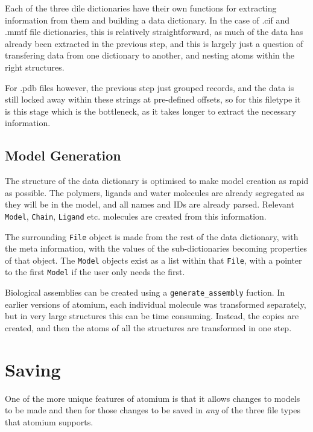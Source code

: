 Each of the three dile dictionaries have their own functions for extracting information from them and building a data dictionary. In the case of .cif and .mmtf file dictionaries, this is relatively straightforward, as much of the data has already been extracted in the previous step, and this is largely just a question of transfering data from one dictionary to another, and nesting atoms within the right structures. 

For .pdb files however, the previous step just grouped records, and the data is still locked away within these strings at pre-defined offsets, so for this filetype it is this stage which is the bottleneck, as it takes longer to extract the necessary information.

\subsection{Model Generation}

The structure of the data dictionary is optimised to make model creation as rapid as possible. The polymers, ligands and water molecules are already segregated as they will be in the model, and all names and IDs are already parsed. Relevant \texttt{Model}, \texttt{Chain}, \texttt{Ligand} etc. molecules are created from this information.

The surrounding \texttt{File} object is made from the rest of the data dictionary, with the meta information, with the values of the sub-dictionaries becoming properties of that object. The \texttt{Model} objects exist as a list within that \texttt{File}, with a pointer to the first \texttt{Model} if the user only needs the first.

Biological assemblies can be created using a \texttt{generate\_assembly} fuction. In earlier versions of atomium, each individual molecule was transformed separately, but in very large structures this can be time consuming. Instead, the copies are created, and then the atoms of all the structures are transformed in one step.

\section{Saving}

One of the more unique features of atomium is that it allows changes to models to be made and then for those changes to be saved in \emph{any} of the three file types that atomium supports.

